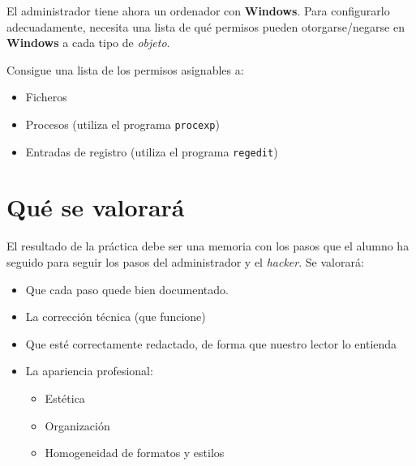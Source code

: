 \begin{homeworkProblem}

  \begin{multicols}{2}

    \null \vfill
    \begin{ActividadAdmin}
      El administrador tiene ahora un ordenador con \textbf{Windows}. Para configurarlo adecuadamente, necesita  una lista de qué permisos pueden otorgarse/negarse en \textbf{Windows} a cada tipo de \textit{objeto}.
    \end{ActividadAdmin}
    \vfill \null
    \columnbreak



    \begin{ActividadAdmin}
      Consigue una lista de los permisos asignables a:
      \begin{itemize}
      \item Ficheros
      \item Procesos (utiliza el programa \texttt{procexp})
      \item Entradas de registro (utiliza el programa \texttt{regedit})
      \end{itemize}
    \end{ActividadAdmin}

  \end{multicols}

  

\end{homeworkProblem}



\section{Qué se valorará}
El resultado de la práctica debe ser una memoria con los pasos que el alumno ha seguido para seguir los pasos del administrador y el \textit{hacker}. Se valorará:
\begin{itemize}
\item Que cada paso quede bien documentado. 
\item La corrección técnica (que funcione)
\item Que esté correctamente redactado, de forma que nuestro lector lo entienda 
\item La apariencia profesional:
  \begin{itemize}
  \item Estética
  \item Organización
  \item Homogeneidad de formatos y estilos
  \end{itemize}
\end{itemize}

